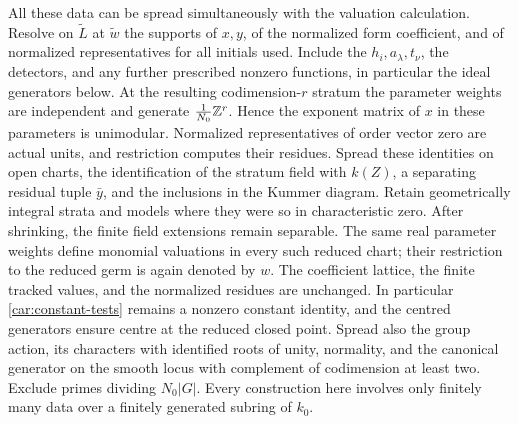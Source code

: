 All these data can be spread simultaneously with the valuation
calculation. Resolve on $\widetilde L$ at $\widetilde w$ the
supports of $x,y$, of the normalized form coefficient, and of
normalized representatives for all initials used. Include the
$h_i,a_\lambda,t_\nu$, the detectors, and any further prescribed
nonzero functions, in particular the ideal generators below.
At the resulting codimension-$r$ stratum the parameter weights
are independent and generate $\frac1{N_0}\mathbb Z^r$. Hence the
exponent matrix of $x$ in these parameters is unimodular.
Normalized representatives of order vector zero are actual
units, and restriction computes their residues. Spread these
identities on open charts, the identification of the stratum
field with $k(Z)$, a separating residual tuple $\bar y$, and
the inclusions in the Kummer diagram. Retain geometrically
integral strata and models where they were so in characteristic
zero. After shrinking, the finite field extensions remain
separable. The same real parameter weights define monomial
valuations in every such reduced chart; their restriction to
the reduced germ is again denoted by $w$. The coefficient
lattice, the finite tracked values, and the normalized residues
are unchanged. In particular \eqref{car:constant-tests} remains
a nonzero constant identity, and the centred generators ensure
centre at the reduced closed point. Spread also the group action,
its characters with identified roots of unity, normality, and
the canonical generator on the smooth locus with complement of
codimension at least two. Exclude primes dividing $N_0|G|$.
Every construction here involves only finitely many data over a
finitely generated subring of $k_0$.

